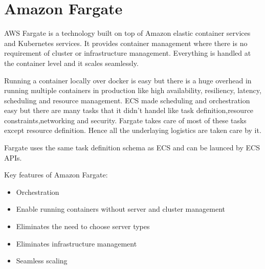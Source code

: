 \section{Amazon Fargate}

AWS Fargate is a technology built on top of Amazon elastic container
services and Kubernetes services. It provides container management where
there is no requirement of cluster or infrastructure management.
Everything is handled at the container level and it scales seamlessly.

Running a container locally over docker is easy but there is a huge
overhead in running multiple containers in production like high
availability, resiliency, latency, scheduling  and resource management.
ECS made scheduling and orchestration easy but there are many tasks that
it didn't handel like task definition,resource constraints,networking
and security. Fargate takes care of most of these tasks except resource
definition. Hence all the underlaying logistics are taken care by it.

Fargate uses the same task definition schema as ECS and can be launced by
ECS APIs.

Key features of Amazon Fargate:

\begin{itemize}
   \item Orchestration 
   \item Enable running containers without server and cluster management
   \item Eliminates the need to choose server types
   \item Eliminates infrastructure management
   \item Seamless scaling  
\end{itemize}~\cite{hid-sp18-522-fargate}
